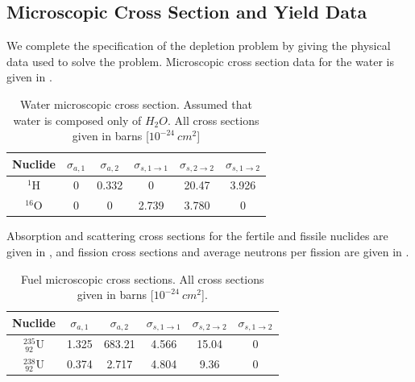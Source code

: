 \subsection{Microscopic Cross Section and Yield Data}

We complete the specification of the depletion problem  by giving the physical data used to solve the problem.  
Microscopic cross section data for the water is given in .  
\begin{table}[!htp]
\begin{center}
\begin{tabular}{|c|c|c|c|c|c|}
\hline
Nuclide &		$\sigma_{a,1}$ & $\sigma_{a,2} $& $\sigma_{s,1\to1} $& $\sigma_{s,2\to2}$ & $\sigma_{s,1\to2}$ \\
\hline
$^1\text{H}$   & 0  &  0.332 & 0 & 20.47 & 3.926 \\
\hline
$^{16}\text{O}$&  0 & 0 &  2.739 & 3.780 & 0 \\
\hline
\end{tabular}	
\end{center}
\caption{Water microscopic cross section.  Assumed that water is composed only of $H_{2} O$.  All cross sections given in barns [$10^{-24}~cm^2$]}
\label{tbl:water}
\end{table}
Absorption and scattering cross sections for the fertile and fissile nuclides are given in ,  
and fission cross sections and average neutrons per fission are given in .  
\begin{table}[!htp]
\begin{center}
\begin{tabular}{|c|c|c|c|c|c|}
\hline
Nuclide &		$\sigma_{a,1}$ & $\sigma_{a,2} $& $\sigma_{s,1\to1} $& $\sigma_{s,2\to2}$ & $\sigma_{s,1\to2}$ \\
\hline
$^{235} _{~92} \text{U}$   & 1.325 &  683.21 & 4.566 & 15.04 & 0\\
\hline
$^{238} _{~92} \text{U}$   & 0.374 &  2.717 & 4.804 & 9.36 & 0 \\
\hline
\end{tabular}	
\end{center}
\caption{Fuel microscopic cross sections. All cross sections given in barns [$10^{-24}~cm^2$].}
\label{tbl:fresh-fuel}
\end{table}
